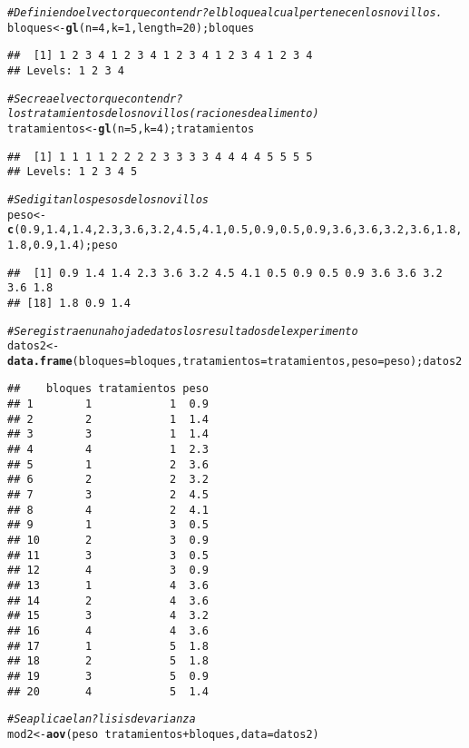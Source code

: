\documentclass[10pt,a4paper]{article}\usepackage[]{graphicx}\usepackage[]{color}
\makeatletter
\newcommand{\hlnum}[1]{\textcolor[rgb]{0.686,0.059,0.569}{#1}}%
\newcommand{\hlcom}[1]{\textcolor[rgb]{0.678,0.584,0.686}{\textit{#1}}}%
\newcommand{\hlopt}[1]{\textcolor[rgb]{0,0,0}{#1}}%
\newcommand{\hlstd}[1]{\textcolor[rgb]{0.345,0.345,0.345}{#1}}%
\newcommand{\hlkwb}[1]{\textcolor[rgb]{0.69,0.353,0.396}{#1}}%
\newcommand{\hlkwc}[1]{\textcolor[rgb]{0.333,0.667,0.333}{#1}}%
\newcommand{\hlkwd}[1]{\textcolor[rgb]{0.737,0.353,0.396}{\textbf{#1}}}%
\newenvironment{kframe}{%
 \def\at@end@of@kframe{}%
 \ifinner\ifhmode%
  \def\at@end@of@kframe{\end{minipage}}%
  \begin{minipage}{\columnwidth}%
 \fi\fi%
 \def\FrameCommand##1{\hskip\@totalleftmargin \hskip-\fboxsep
 \colorbox{shadecolor}{##1}\hskip-\fboxsep
     \hskip-\linewidth \hskip-\@totalleftmargin \hskip\columnwidth}%
 \MakeFramed {\advance\hsize-\width
   \@totalleftmargin\z@ \linewidth\hsize
   \@setminipage}}%
 {\par\unskip\endMakeFramed%
 \at@end@of@kframe}
\newenvironment{knitrout}{}{} %
\makeatother
\begin{document}
\begin{knitrout}
\begin{kframe}
\begin{alltt}
\hlcom{# Definiendo el vector que contendr? el bloque al cual pertenecen los novillos.}
\hlstd{bloques} \hlkwb{<-} \hlkwd{gl}\hlstd{(}\hlkwc{n}\hlstd{=}\hlnum{4}\hlstd{,} \hlkwc{k}\hlstd{=}\hlnum{1}\hlstd{,} \hlkwc{length}\hlstd{=}\hlnum{20}\hlstd{);bloques}
\end{alltt}
\begin{verbatim}
##  [1] 1 2 3 4 1 2 3 4 1 2 3 4 1 2 3 4 1 2 3 4
## Levels: 1 2 3 4
\end{verbatim}
\begin{alltt}
\hlcom{# Se crea el vector que contendr? los tratamientos de los novillos (raciones de alimento)}
\hlstd{tratamientos} \hlkwb{<-} \hlkwd{gl}\hlstd{(}\hlkwc{n}\hlstd{=}\hlnum{5}\hlstd{,} \hlkwc{k}\hlstd{=}\hlnum{4}\hlstd{);tratamientos}
\end{alltt}
\begin{verbatim}
##  [1] 1 1 1 1 2 2 2 2 3 3 3 3 4 4 4 4 5 5 5 5
## Levels: 1 2 3 4 5
\end{verbatim}
\begin{alltt}
\hlcom{# Se digitan los pesos de los novillos }
\hlstd{peso} \hlkwb{<-} \hlkwd{c}\hlstd{(}\hlnum{0.9}\hlstd{,}\hlnum{1.4}\hlstd{,}\hlnum{1.4}\hlstd{,}\hlnum{2.3}\hlstd{,}\hlnum{3.6}\hlstd{,}\hlnum{3.2}\hlstd{,}\hlnum{4.5}\hlstd{,}\hlnum{4.1}\hlstd{,}\hlnum{0.5}\hlstd{,}\hlnum{0.9}\hlstd{,}\hlnum{0.5}\hlstd{,}\hlnum{0.9}\hlstd{,}\hlnum{3.6}\hlstd{,}\hlnum{3.6}\hlstd{,}\hlnum{3.2}\hlstd{,}\hlnum{3.6}\hlstd{,}\hlnum{1.8}\hlstd{,}\hlnum{1.8}\hlstd{,}\hlnum{0.9}\hlstd{,}\hlnum{1.4} \hlstd{);peso}
\end{alltt}
\begin{verbatim}
##  [1] 0.9 1.4 1.4 2.3 3.6 3.2 4.5 4.1 0.5 0.9 0.5 0.9 3.6 3.6 3.2 3.6 1.8
## [18] 1.8 0.9 1.4
\end{verbatim}
\begin{alltt}
\hlcom{# Se registra en una hoja de datos los resultados del experimento}
\hlstd{datos2} \hlkwb{<-} \hlkwd{data.frame}\hlstd{(}\hlkwc{bloques} \hlstd{= bloques,} \hlkwc{tratamientos} \hlstd{= tratamientos,} \hlkwc{peso} \hlstd{= peso);datos2}
\end{alltt}
\begin{verbatim}
##    bloques tratamientos peso
## 1        1            1  0.9
## 2        2            1  1.4
## 3        3            1  1.4
## 4        4            1  2.3
## 5        1            2  3.6
## 6        2            2  3.2
## 7        3            2  4.5
## 8        4            2  4.1
## 9        1            3  0.5
## 10       2            3  0.9
## 11       3            3  0.5
## 12       4            3  0.9
## 13       1            4  3.6
## 14       2            4  3.6
## 15       3            4  3.2
## 16       4            4  3.6
## 17       1            5  1.8
## 18       2            5  1.8
## 19       3            5  0.9
## 20       4            5  1.4
\end{verbatim}
\begin{alltt}
\hlcom{# Se aplica el an?lisis de varianza }
\hlstd{mod2} \hlkwb{<-} \hlkwd{aov}\hlstd{(peso} \hlopt{~} \hlstd{tratamientos} \hlopt{+} \hlstd{bloques,} \hlkwc{data} \hlstd{= datos2)}


\end{alltt}
\end{kframe}
\end{knitrout}
\end{document}
